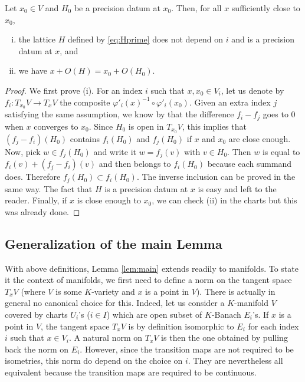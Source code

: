 \documentclass{lms}
\begin{document}
\begin{prop}
Let $x_0 \in V$ and $H_0$ be a precision datum at $x_0$.
Then, for all $x$ sufficiently close to $x_0$,
\begin{enumerate}[(i)]
\item the lattice $H$ defined by \eqref{eq:Hprime} does not depend 
on $i$ and is a precision datum at $x$, and
\item we have $x + O(H) = x_0 + O(H_0)$.
\end{enumerate}
\end{prop}

\begin{proof}
We first prove (i). For an index $i$ such that $x, x_0 \in V_i$, let us 
denote by $f_i : T_{x_0} V \to T_x V$ the composite $\varphi'_i(x)^{-1} 
\circ \varphi'_i(x_0)$. Given an extra index $j$ satisfying the same
assumption, we know by  that the difference
$f_i - f_j$ goes to $0$ when $x$ converges to $x_0$. Since $H_0$ is open
in $T_{x_0} V$, this implies that $(f_j - f_i)(H_0)$ contains $f_i(H_0)$ and 
$f_j(H_0)$ if $x$ and $x_0$ are close enough. Now, pick $w \in f_j(H_0)$ and 
write it $w = f_j(v)$ with $v \in H_0$. Then $w$ is equal to $f_i(v) + 
(f_j - f_i)(v)$ and then belongs to $f_i(H_0)$ because each summand does. 
Therefore $f_j(H_0) \subset f_i(H_0)$. The inverse inclusion can be proved 
in the same way. The fact that $H$ is a precision datum at $x$ is easy
and left to the reader.
Finally, if $x$ is close enough to $x_0$, we can check (ii) in the 
charts but this was already done.
\end{proof}

\subsection{Generalization of the main Lemma}

With above definitions, Lemma \ref{lem:main} extends readily to 
manifolds. To state it the context of manifolds, we first need to define 
a norm on the tangent space $T_x V$ (where $V$ is some $K$-variety and 
$x$ is a point in $V$). There is actually in general no canonical choice 
for this. Indeed, let us consider a $K$-manifold $V$ covered by charts 
$U_i$'s ($i \in I$) which are open subset of $K$-Banach $E_i$'s. If $x$ 
is a point in $V$, the tangent space $T_x V$ is by definition isomorphic 
to $E_i$ for each index $i$ such that $x \in V_i$. A natural norm on 
$T_x V$ is then the one obtained by pulling back the norm on $E_i$. 
However, since the transition maps are not required to be isometries, 
this norm do depend on the choice on $i$. They are nevertheless all
equivalent because the transition maps are required to be continuous.
\end{document}
